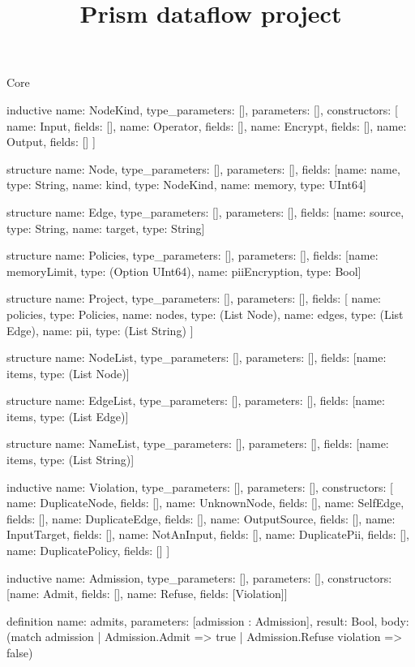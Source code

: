 \begin{lexlean}{Core}
\title{Prism dataflow project}
\begin{semanticmodule}
inductive{
  name: NodeKind,
  type_parameters: [],
  parameters: [],
  constructors: [
    {name: Input, fields: []},
    {name: Operator, fields: []},
    {name: Encrypt, fields: []},
    {name: Output, fields: []}
  ]
}

structure{
  name: Node,
  type_parameters: [],
  parameters: [],
  fields: [{name: name, type: String}, {name: kind, type: NodeKind}, {name: memory, type: UInt64}]
}

structure{
  name: Edge,
  type_parameters: [],
  parameters: [],
  fields: [{name: source, type: String}, {name: target, type: String}]
}

structure{
  name: Policies,
  type_parameters: [],
  parameters: [],
  fields: [{name: memoryLimit, type: (Option UInt64)}, {name: piiEncryption, type: Bool}]
}

structure{
  name: Project,
  type_parameters: [],
  parameters: [],
  fields: [
    {name: policies, type: Policies},
    {name: nodes, type: (List Node)},
    {name: edges, type: (List Edge)},
    {name: pii, type: (List String)}
  ]
}

structure{
  name: NodeList,
  type_parameters: [],
  parameters: [],
  fields: [{name: items, type: (List Node)}]
}

structure{
  name: EdgeList,
  type_parameters: [],
  parameters: [],
  fields: [{name: items, type: (List Edge)}]
}

structure{
  name: NameList,
  type_parameters: [],
  parameters: [],
  fields: [{name: items, type: (List String)}]
}

inductive{
  name: Violation,
  type_parameters: [],
  parameters: [],
  constructors: [
    {name: DuplicateNode, fields: []},
    {name: UnknownNode, fields: []},
    {name: SelfEdge, fields: []},
    {name: DuplicateEdge, fields: []},
    {name: OutputSource, fields: []},
    {name: InputTarget, fields: []},
    {name: NotAnInput, fields: []},
    {name: DuplicatePii, fields: []},
    {name: DuplicatePolicy, fields: []}
  ]
}

inductive{
  name: Admission,
  type_parameters: [],
  parameters: [],
  constructors: [{name: Admit, fields: []}, {name: Refuse, fields: [Violation]}]
}

definition{
  name: admits,
  parameters: [admission : Admission],
  result: Bool,
  body: (match admission | Admission.Admit => true | Admission.Refuse violation => false)
}


\end{semanticmodule}
\end{lexlean}
